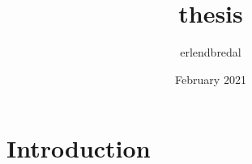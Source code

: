 \documentclass{article}
\title{thesis}
\author{erlendbredal }
\date{February 2021}
\begin{document}
\maketitle

\section{Introduction}
\end{document}
